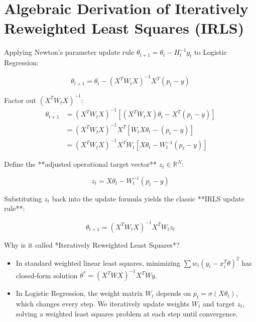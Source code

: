\section{Algebraic Derivation of Iteratively Reweighted Least Squares (IRLS)}
Applying Newton's parameter update rule $\theta_{t+1} = \theta_t - H_t^{-1} g_t$ to Logistic Regression:

\begin{equation}
\theta_{t+1} = \theta_t - (X^T W_t X)^{-1} X^T (p_t - y)
\end{equation}

Factor out $(X^T W_t X)^{-1}$:
\begin{align}
\theta_{t+1} &= (X^T W_t X)^{-1} \left[ (X^T W_t X) \theta_t - X^T (p_t - y) \right] \\
&= (X^T W_t X)^{-1} X^T \left[ W_t X \theta_t - (p_t - y) \right] \\
&= (X^T W_t X)^{-1} X^T W_t \left[ X \theta_t - W_t^{-1} (p_t - y) \right]
\end{align}

Define the **adjusted operational target vector** $z_t \in \mathbb{R}^N$:

\begin{equation}
z_t = X \theta_t - W_t^{-1} (p_t - y)
\end{equation}

Substituting $z_t$ back into the update formula yields the classic **IRLS update rule**:

\begin{mathbox}
\begin{equation}
\theta_{t+1} = (X^T W_t X)^{-1} X^T W_t z_t
\end{equation}
\end{mathbox}

Why is it called *Iteratively Reweighted Least Squares*?
\begin{itemize}[leftmargin=*]
    \item In standard weighted linear least squares, minimizing $\sum w_i (y_i - x_i^T \theta)^2$ has closed-form solution $\theta^* = (X^T W X)^{-1} X^T W y$.
    \item In Logistic Regression, the weight matrix $W_t$ depends on $p_t = \sigma(X \theta_t)$, which changes every step. We iteratively update weights $W_t$ and target $z_t$, solving a weighted least squares problem at each step until convergence.
\end{itemize}


